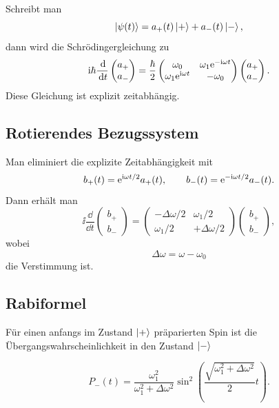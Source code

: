 Schreibt man
\[
    \left|\psi(t)\right\rangle=a_+(t)\left|+\right\rangle+a_-(t)\left|-\right\rangle,
\]
dann wird die Schrödingergleichung zu
\[
    \mathrm{i}\hbar\frac{\,\mathrm{d}}{\,\mathrm{d} t}
    \begin{pmatrix}
        a_+\\a_-
    \end{pmatrix}
    =\frac{\hbar}{2}
    \begin{pmatrix}
        \omega_0&\omega_1\mathrm{e}^{-\mathrm{i}\omega t}\\
        \omega_1\mathrm{e}^{\mathrm{i}\omega t}&-\omega_0
    \end{pmatrix}
    \begin{pmatrix}
        a_+\\a_-
    \end{pmatrix}.
\]
Diese Gleichung ist explizit zeitabhängig.

\subsection{Rotierendes Bezugssystem}

Man eliminiert die explizite Zeitabhängigkeit mit
\[
    b_+(t)=\mathrm{e}^{\mathrm{i}\omega t/2}a_+(t),
    \qquad
    b_-(t)=\mathrm{e}^{-\mathrm{i}\omega t/2}a_-(t).
\]
Dann erhält man
\[
    \ii\frac{\dd}{\dd t}
    \begin{pmatrix}
        b_+\\b_-
    \end{pmatrix}
    =
    \begin{pmatrix}
        -\Delta\omega/2&\omega_1/2\\
        \omega_1/2&+\Delta\omega/2
    \end{pmatrix}
    \begin{pmatrix}
        b_+\\b_-
    \end{pmatrix},
\]
wobei
\[
    \Delta\omega=\omega-\omega_0
\]
die Verstimmung ist.

\subsection{Rabiformel}

Für einen anfangs im Zustand \(\left|+\right\rangle\) präparierten Spin ist die Übergangswahrscheinlichkeit in den Zustand \(\left|-\right\rangle\)
\begin{formulabox}
\[
    P_-(t)
    =\frac{\omega_1^2}{\omega_1^2+\Delta\omega^2}
    \sin^2\left(\frac{\sqrt{\omega_1^2+\Delta\omega^2}}{2}t\right).
\]
\end{formulabox}

